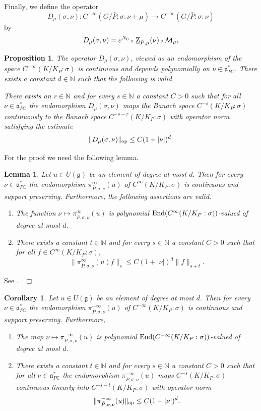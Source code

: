 \documentclass[12pt,a4paper]{article}
\newtheorem{Cor}[Thm]{Corollary}
\newtheorem{Lemma}[Thm]{Lemma}
\newtheorem{Prop}[Thm]{Proposition}
\newenvironment{cor}[0]{\begin{Cor}\noindent}%
{\end{Cor}}
\newenvironment{lemma}[0]{\begin{Lemma}\noindent}%
{\end{Lemma}}
\newenvironment{prop}[0]{\begin{Prop}\noindent}%
{\end{Prop}}
\def\proof{\par\noindent{\it Proof.}{\ }{\ }}
\def\qed{~\hfill\hbox{$\Box$}\medbreak}
\def\itema{\vspace{-1mm}\item[{\rm (a)}]}
\def\itemb{\item[{\rm (b)}]}
\def\msy#1{{\mathbb #1}}
\def\C{{\msy C}}
\def\N{{\msy N}}
\def\ge{\varepsilon}
\def\gs{\sigma}
\def\got#1{\mathfrak #1}
\def\fa{{\got a}}
\def\fg{{\got g}}
\def\to{\rightarrow}
\def\End{{\rm End}}
\def\after{\,{\scriptstyle\circ}\,}
\def\iC{{\scriptscriptstyle \C}}
\def\cM{{\mathcal M}}
\numberwithin{Thm}{section}
\numberwithin{equation}{section}
\def\faPdc{{\fa_{P\iC}^*}}
\numberwithin{equation}{section}
\def\faPdc{\fa_{P\iC}^*}
\def\ulZ{\, \underline{\rm Z}}
\def\gsP{\gs}%
\begin{document}
Finally, we define the operator 
$$ 
D_\mu(\gs,\nu): C^{-\infty}(G/\bar P:\gs: \nu + \mu) \to C^{-\infty}(G/\bar P:\gs:\nu)
$$ 
by 
\begin{equation}
\label{e: defi D mu}
D_\mu(\gs, \nu)= \ge^{N_0} \after \ulZ_{\bar P, \mu}(\nu)  \after \cM_\mu,
\end{equation}
 
\begin{prop}
\label{p: estimate of generalized operator norm D mu}
The operator $D_\mu(\gs,\nu)$, viewed as an endomorphism of  the  space 
$C^{-\infty}(K/K_P:\gs)$ is continuous and depends polynomially
on $\nu \in \faPdc.$ There exists a constant $d \in \N$ such that the following is valid.

There exists an $r \in \N$ and for every $s \in \N$ a constant $C > 0$ such that for all $\nu \in \faPdc$ the endomorphism $D_\mu(\gs,\nu)$
maps the Banach space $C^{-s}(K/K_P:\gs)$ continuously to the Banach space $C^{-s-r}(K/K_P:\gs)$ 
with operator norm satisfying the estimate
$$ 
\| D_\mu(\gs, \nu) \|_{\rm op} \leq C(1 + |\nu |)^d.
$$ 
\end{prop}

For the proof we need the following lemma. 

\begin{lemma}
\label{l: estimate infinitesimal action}
Let $u \in U(\fg)$ be an element of degree at most $d.$ Then  for every $\nu \in \faPdc$ the endomorphism
$\pi_{\bar P, \gs, \nu}^{\infty}(u)$ of $C^{\infty}(K/K_P :\gsP)$ is continuous and support preserving. Furthermore, the following assertions are valid.
\begin{enumerate}
\itema The function $\nu \mapsto \pi_{\bar P, \gs, \nu}^{\infty}(u)$ is polynomial 
$\End(C^\infty(K/K_P:\gsP))$-valued of degree at most $d.$ 
\itemb There exists a constant $t \in \N$ and for every  $s \in \N$ a constant $C > 0$ such 
that for all $f \in C^\infty(K/K_P: \gsP),$ 
$$ 
\| \pi_{\bar P, \gs, \nu}^{\infty}(u) f\|_{s} \leq C (1 + |\nu|)^d \|f\|_{s +t}.
$$ 
\end{enumerate}
\end{lemma}

\proof 
See \cite[Lemma 2.1]{BScfunc}.
\qed

\begin{cor}
\label{c: estimate dual infinitesimal action}
Let $u \in U(\fg)$ be an element of degree at most $d.$ Then  for every $\nu \in \faPdc$ the endomorphism
$\pi_{\bar P, \gs, \nu}^{- \infty}(u)$ of $C^{-\infty}(K/K_P :\gsP)$ is continuous and support preserving. Furthermore,
\begin{enumerate}
\itema The map $\nu \mapsto \pi_{\bar P, \gs, \nu}^{- \infty}(u)$ is polynomial 
$\End(C^{- \infty}(K/K_P:\gsP))$-valued of degree at most $d.$ 
\itemb There exists a constant $t \in \N$ and for every  $s \in \N$ a constant $C > 0$ such that 
for all $\nu \in \faPdc$ the endomorphism $\pi_{\bar P, \gs, \nu}^{- \infty}(u)$ maps $C^{-s}(K/K_P:\gsP)$ 
continuous linearly into $C^{-s-t}(K/K_P:\gsP)$  with operator norm
$$ 
\| \pi_{\bar P, \gs, \nu}^{- \infty}(u)\|_{\rm op} \leq C (1 + |\nu|)^d.
$$ 
\end{enumerate}
\end{cor}
\end{document}
